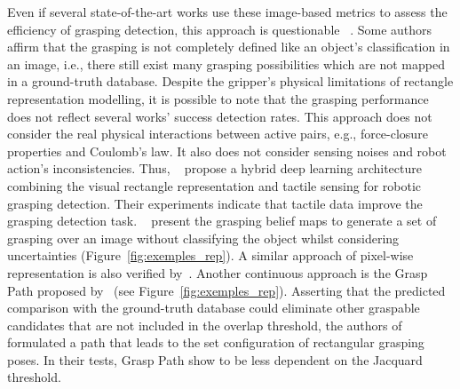 Even if several state-of-the-art works use these image-based metrics to assess the efficiency of grasping detection, this approach is questionable ~\cite{Guo2017,Gariepy2019,Mousavian_2019_ICCV,Ghazaei2019,TenPas2017,choi2018learning, Chen2019}. Some authors~\cite{Gariepy2019,Ghazaei2019} affirm that the grasping is not completely defined like an object's classification in an image, i.e., there still exist many grasping possibilities which are not mapped in a ground-truth database. Despite the gripper's physical limitations of rectangle representation modelling,  it is possible to note that the grasping performance does not reflect several works' success detection rates. This approach does not consider the real physical interactions between active pairs, e.g., force-closure properties and Coulomb's law. It also does not consider sensing noises and robot action's inconsistencies. Thus, \citeauthor{Guo2017}~\cite{Guo2017} propose a hybrid deep learning architecture combining the visual rectangle representation and tactile sensing for robotic grasping detection. Their experiments indicate that tactile data improve the grasping detection task. \citeauthor{Ghazaei2019}~\cite{Ghazaei2019} present the grasping belief maps to generate a set of grasping over an image without classifying the object whilst considering uncertainties (Figure~\ref{fig:exemples_rep}). A similar approach of pixel-wise representation is also verified by~\cite{Zeng2018}. Another continuous approach is the Grasp Path proposed by~\cite{Chen2019,Chen2020} (see Figure~\ref{fig:exemples_rep}). Asserting that the predicted comparison with the ground-truth database could eliminate other graspable candidates that are not included in the overlap threshold, the authors of~\cite{Chen2019,Chen2020} formulated a path that leads to the set configuration of rectangular grasping poses. In their tests, Grasp Path show to be less dependent on the Jacquard threshold. 


